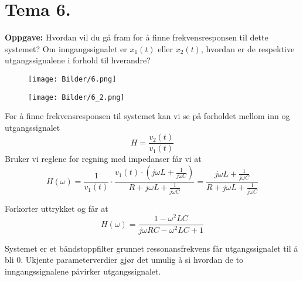 \documentclass[a4paper,11pt,norsk]{article}
\begin{document}
\section{Tema 6.}
\begin{question}
    \textbf{Oppgave:}
        Hvordan vil du gå fram for å finne frekvensresponsen til dette systemet?
        Om inngangssignalet er $x_1(t)$ eller $x_2(t)$, hvordan er de respektive
        utgangssignalene i forhold til hverandre?
                
        \begin{figure}[H]
            \centering 
            \begin{minipage}{0.3\textwidth}
                \texttt{[image: Bilder/6.png]}
            \end{minipage}
            \begin{minipage}{0.3\textwidth}
                \texttt{[image: Bilder/6\_2.png]}
            \end{minipage}
        \end{figure}
\end{question}
For å finne frekvensresponsen til systemet kan vi se på forholdet mellom inn 
og utgangssignalet
\[
    H = \frac{v_2(t)}{v_1(t)}
\]
Bruker vi reglene for regning med impedanser får vi at
\[
    H(\omega) = \frac{1}{v_1(t)} \cdot \frac{v_1(t) \cdot (j\omega L + \frac{1}{j\omega C})}{R + j\omega L + \frac{1}{j\omega C}} = \frac{j\omega L + \frac{1}{j\omega C}}{R + j\omega L + \frac{1}{j\omega C}}
\]

Forkorter uttrykket og får at
\[
    H(\omega) = \frac{1 - \omega^2LC}{j\omega RC - \omega^2 LC + 1}
\]

Systemet er et båndstoppfilter grunnet ressonansfrekvens får utgangssignalet til å bli 0.
Ukjente parameterverdier gjør det umulig å si hvordan de to inngangssignalene påvirker utgangssignalet.

\newpage
\end{document}
